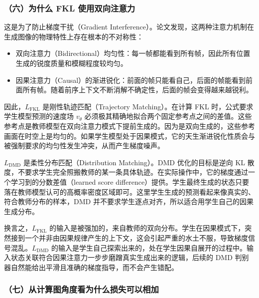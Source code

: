 \hypertarget{ux516dux4e3aux4ec0ux4e48-fkl-ux4f7fux7528ux53ccux5411ux6ce8ux610fux529b}{%
\subsubsection{（六）为什么 FKL 使用双向注意力}\label{ux516dux4e3aux4ec0ux4e48-fkl-ux4f7fux7528ux53ccux5411ux6ce8ux610fux529b}}

这是为了防止梯度干扰（Gradient Interference）。论文发现，这两种注意力机制在生成图像的物理特性上存在根本的不对称性：

\begin{itemize}
\tightlist
\item
  双向注意力（Bidirectional）均匀性：每一帧都能看到所有帧，因此所有位置生成的锐度质量和模糊程度较均匀。
\item
  因果注意力（Causal）的渐进锐化：前面的帧只能看自己，后面的帧能看到前面所有帧。随着前序上下文不断消解不确定性，后面的帧会变得越来越锐利。
\end{itemize}

因此，\(L_{\mathrm{FKL}}\) 是刚性轨迹匹配（Trajectory Matching）。在计算 FKL 时，公式要求学生模型预测的速度场 \(v_\theta\) 必须极其精确地拟合两个固定参考点之间的差值。这些参考点是教师模型在双向注意力模式下提前生成的。因为是双向生成的，这些参考画面在时空上是均匀的。如果学生模型处于因果模式，它的天生渐进锐化性质会与被强制要求的均匀性发生冲突，从而产生梯度噪声。

\(L_{\mathrm{DMD}}\) 是柔性分布匹配（Distribution Matching）。DMD 优化的目标是逆向 KL 散度，不要求学生完全照搬教师的某一条具体轨迹。在实际操作中，它的梯度通过一个学习到的分数差值（learned score difference）提供。学生最终生成的状态只要落在教师模型认可的高概率密度区域即可。这里学生生成的预测看起来像真实的、符合教师分布的样本，DMD 并不要求学生逐点对齐，所以适合用学生自己的因果生成分布。

换言之，\(L_{\mathrm{FKL}}\) 的输入是被强加的，来自教师的双向分布。学生在因果模式下，突然接到一个并非由因果规律产生的上下文，这会引起严重的水土不服，导致梯度信号混乱。\(L_{\mathrm{DMD}}\) 的输入是学生自己探索出来的，处在学生因果自展开的过程中。输入状态关联符合因果注意力一步步磨蹭真实生成出来的逻辑，后续的 DMD 判别器自然能给出平滑且准确的梯度指导，而不会产生错配。

\hypertarget{ux4e03ux4eceux8ba1ux7b97ux56feux89d2ux5ea6ux770bux4e3aux4ec0ux4e48ux635fux5931ux53efux4ee5ux76f8ux52a0}{%
\subsubsection{（七）从计算图角度看为什么损失可以相加}\label{ux4e03ux4eceux8ba1ux7b97ux56feux89d2ux5ea6ux770bux4e3aux4ec0ux4e48ux635fux5931ux53efux4ee5ux76f8ux52a0}}

